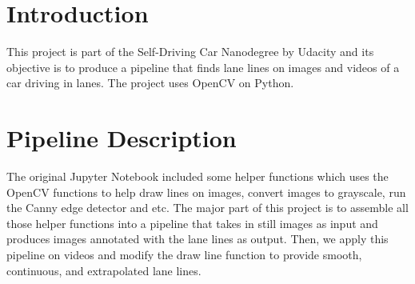 \documentclass[12pt,twoside]{article}
\begin{document}



\section{Introduction}
This project is part of the Self-Driving Car Nanodegree by Udacity and its objective is to produce a pipeline that finds lane lines on images and videos of a car driving in lanes. The project uses OpenCV on Python.

\section{Pipeline Description}
The original Jupyter Notebook included some helper functions which uses the OpenCV functions to help draw lines on images, convert images to grayscale, run the Canny edge detector and etc. The major part of this project is to assemble all those helper functions into a pipeline that takes in still images as input and produces images annotated with the lane lines as output. Then, we apply this pipeline on videos and modify the draw line function to provide smooth, continuous, and extrapolated lane lines.\\
\end{document}
